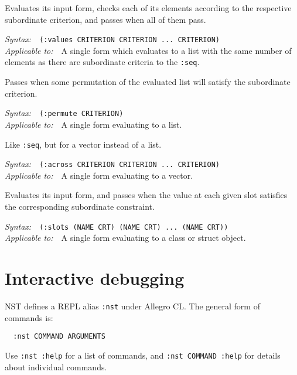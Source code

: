 \documentclass{article}
\newenvironment{criteria}%
{\begin{list}{}
    {\setlength{\labelwidth}{0pt}
     \setlength{\leftmargin}{2em}
     \setlength{\rightmargin}{1em}
     \setlength{\itemindent}{0em}}}%
  {\end{list}}
\def\criterion#1#2#3#4{\item[\bfseries #1] #4\par
  \emph{Syntax:}~~\texttt{#2}\\ \emph{Applicable to:}~~#3}
\begin{document}
\begin{criteria}
  \criterion{:seq}{(:values CRITERION CRITERION ...\ CRITERION)}{A
    single form which evaluates to a list with the same number of
    elements as there are subordinate criteria to the
    \texttt{:seq}.}{Evaluates its input form, checks each of its
    elements according to the respective subordinate criterion, and
    passes when all of them pass.}

  \criterion{:permute}{(:permute CRITERION)}{A single form evaluating
    to a list.}{Passes when some permutation of the evaluated list
    will satisfy the subordinate criterion.}

  \criterion{:across}{(:across CRITERION CRITERION ...\ CRITERION)}{A
    single form evaluating to a vector.}{Like \texttt{:seq}, but for a
    vector instead of a list.}

  \criterion{:slots}{\small(:slots (NAME CRT) (NAME CRT) ...\ (NAME
    CRT))}{A single form evaluating to a class or struct
    object.}{Evaluates its input form, and passes when the value at
    each given slot satisfies the corresponding subordinate
    constraint.}
\end{criteria}

\section*{Interactive debugging}
NST defines a REPL alias \texttt{:nst} under Allegro CL.  The general
form of commands is:
\begin{verbatim}
  :nst COMMAND ARGUMENTS
\end{verbatim}
Use \mbox{\texttt{:nst :help}} for a list of commands, and
\mbox{\texttt{:nst COMMAND :help}} for details about individual
commands.
\end{document}
